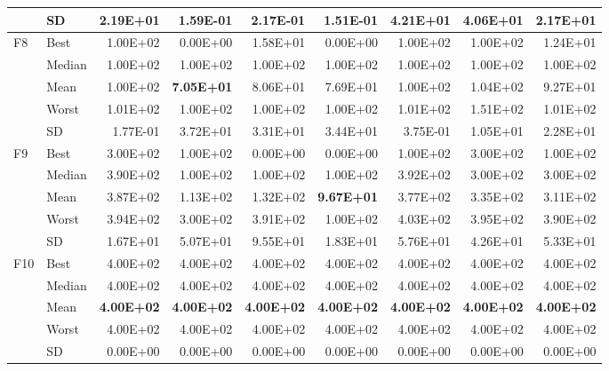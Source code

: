\documentclass[10pt,a4paper]{article}
\newcommand{\bestval}[1]{\textbf{#1}}
\begin{document}
\begin{table}[p]
\begin{tabular}{llrrrrrrr}
 & SD & 2.19E+01 & 1.59E-01 & 2.17E-01 & 1.51E-01 & 4.21E+01 & 4.06E+01 & 2.17E+01 \\
\midrule
F8 & Best & 1.00E+02 & 0.00E+00 & 1.58E+01 & 0.00E+00 & 1.00E+02 & 1.00E+02 & 1.24E+01 \\
 & Median & 1.00E+02 & 1.00E+02 & 1.00E+02 & 1.00E+02 & 1.00E+02 & 1.00E+02 & 1.00E+02 \\
 & Mean & 1.00E+02 & \bestval{7.05E+01} & 8.06E+01 & 7.69E+01 & 1.00E+02 & 1.04E+02 & 9.27E+01 \\
 & Worst & 1.01E+02 & 1.00E+02 & 1.00E+02 & 1.00E+02 & 1.01E+02 & 1.51E+02 & 1.01E+02 \\
 & SD & 1.77E-01 & 3.72E+01 & 3.31E+01 & 3.44E+01 & 3.75E-01 & 1.05E+01 & 2.28E+01 \\
\midrule
F9 & Best & 3.00E+02 & 1.00E+02 & 0.00E+00 & 0.00E+00 & 1.00E+02 & 3.00E+02 & 1.00E+02 \\
 & Median & 3.90E+02 & 1.00E+02 & 1.00E+02 & 1.00E+02 & 3.92E+02 & 3.00E+02 & 3.00E+02 \\
 & Mean & 3.87E+02 & 1.13E+02 & 1.32E+02 & \bestval{9.67E+01} & 3.77E+02 & 3.35E+02 & 3.11E+02 \\
 & Worst & 3.94E+02 & 3.00E+02 & 3.91E+02 & 1.00E+02 & 4.03E+02 & 3.95E+02 & 3.90E+02 \\
 & SD & 1.67E+01 & 5.07E+01 & 9.55E+01 & 1.83E+01 & 5.76E+01 & 4.26E+01 & 5.33E+01 \\
\midrule
F10 & Best & 4.00E+02 & 4.00E+02 & 4.00E+02 & 4.00E+02 & 4.00E+02 & 4.00E+02 & 4.00E+02 \\
 & Median & 4.00E+02 & 4.00E+02 & 4.00E+02 & 4.00E+02 & 4.00E+02 & 4.00E+02 & 4.00E+02 \\
 & Mean & \bestval{4.00E+02} & \bestval{4.00E+02} & \bestval{4.00E+02} & \bestval{4.00E+02} & \bestval{4.00E+02} & \bestval{4.00E+02} & \bestval{4.00E+02} \\
 & Worst & 4.00E+02 & 4.00E+02 & 4.00E+02 & 4.00E+02 & 4.00E+02 & 4.00E+02 & 4.00E+02 \\
 & SD & 0.00E+00 & 0.00E+00 & 0.00E+00 & 0.00E+00 & 0.00E+00 & 0.00E+00 & 0.00E+00 \\
\bottomrule
\end{tabular}
\end{table}
\end{document}

